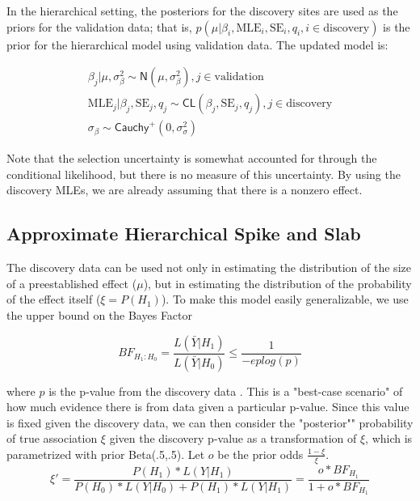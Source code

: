 \documentclass[AMA,STIX1COL]{WileyNJD-v2}\usepackage[]{graphicx}\usepackage[]{color}
\begin{document}
In the hierarchical setting, the posteriors for the discovery sites are used as the priors for the validation data; that is, $p(\mu| \beta_i, \text{MLE}_i,\text{SE}_i, q_i, i \in  \text{discovery})$ is the prior for the hierarchical model using validation data. The updated model is:

\begin{gather} \label{eq6}
\beta_{j}|\mu, \sigma_{\beta}^{2} \sim \textsf{N}(\mu, \sigma_{\beta}^{2}) , j \in \text{validation}\\
\text{MLE}_{j}|\beta_{j},\text{SE}_{j}, q_j \sim \textsf{CL}(\beta_{j},\text{SE}_{j}, q_j) , j \in \text{discovery}\\
\sigma_{\beta}\sim \textsf{Cauchy}^+(0,\sigma^2_{\sigma})
\end{gather}

Note that the selection uncertainty is somewhat accounted for through the conditional likelihood, but there is no measure of this uncertainty. By using the discovery MLEs, we are already assuming that there is a nonzero effect.


\subsection{Approximate Hierarchical Spike and Slab}

The discovery data can be used not only in estimating the distribution of the size of a preestablished effect ($\mu$), but in estimating the distribution of the probability of the effect itself ($\xi = P(H_1)$). To make this model easily generalizable, we use the upper bound on the Bayes Factor

\begin{equation}\label{eq7}
BF_{H_1:H_0} = \frac{L(\bar Y | H_1)}{L(\bar Y | H_0)} \leq \frac{1}{-e p log(p)}
\end{equation}

where $p$ is the p-value from the discovery data \cite{sellke2001calibration}. This is a "best-case scenario" of how much evidence there is from data given a particular p-value. Since this value is fixed given the discovery data, we can then consider the "posterior"" probability of true association $\xi$ given the discovery p-value as a transformation of $\xi$, which is parametrized with prior Beta(.5,.5). Let $o$ be the prior odds $\frac{1-\xi}{\xi}$.
\begin{equation}\label{eq8}
\xi' = \frac{P(H_1)*L(Y|H_1)}{P(H_0)*L(Y|H_0)+P(H_1)*L(Y|H_1)} = \frac{o*BF_{H_1}}{1+o*BF_{H_1}}
\end{equation}
\end{document}

